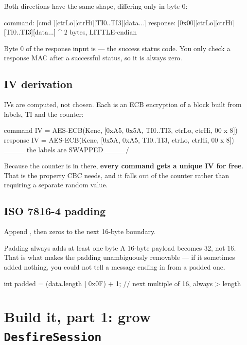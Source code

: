 Both directions have the same shape, differing only in byte 0:

\begin{trace}
command:   [cmd ][ctrLo][ctrHi][TI0..TI3][data...]
response:  [0x00][ctrLo][ctrHi][TI0..TI3][data...]
                    ^
              2 bytes, LITTLE-endian
\end{trace}

Byte 0 of the response input is  --- the success status code. You only
check a response MAC after a successful status, so it is always zero.

\subsection{IV derivation}

IVs are computed, not chosen. Each is an ECB encryption of a block built from
labels, TI and the counter:

\begin{trace}
command IV  = AES-ECB(Kenc, [0xA5, 0x5A, TI0..TI3, ctrLo, ctrHi, 00 x 8])
response IV = AES-ECB(Kenc, [0x5A, 0xA5, TI0..TI3, ctrLo, ctrHi, 00 x 8])
                             \____ the labels are SWAPPED ____/
\end{trace}

Because the counter is in there, \textbf{every command gets a unique IV for
free}. That is the property CBC needs, and it falls out of the counter rather
than requiring a separate random value.

\subsection{ISO 7816-4 padding}

Append , then zeros to the next 16-byte boundary.

\begin{trap}{Padding always adds at least one byte}
A 16-byte payload becomes 32, not 16. That is what makes the padding
unambiguously removable --- if it sometimes added nothing, you could not tell a
message ending in  from a padded one.

\begin{jcode}
int padded = (data.length | 0x0F) + 1;   // next multiple of 16, always > length
\end{jcode}
\end{trap}

\section{Build it, part 1: grow \texttt{DesfireSession}}

